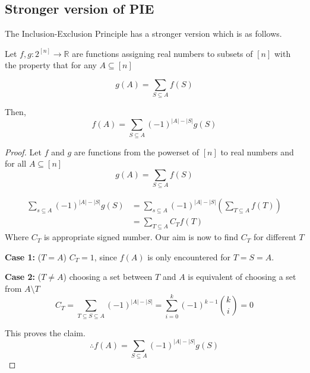 \subsection{Stronger version of PIE}
The Inclusion-Exclusion Principle has a stronger version which is as follows.

\begin{theorem}
  \label{stronger PIE}
  Let $f,g:2^{[n]}\longrightarrow \mathbb{R}$ are functions assigning real numbers to subsets of $[n]$ with the property that for any $A\subseteq [n]$

  \[ g(A)=\sum_{S\subseteq A} f(S)\]

  Then,
  \[ f(A) = \sum_{S \subseteq A} (-1)^{|A|-|S|}g(S)\]

\end{theorem}


\begin{proof}
  Let $f$ and $g$ are functions from the powerset of $[n]$ to real numbers and for all $A \subseteq [n]$
  \[g(A)=\sum_{S\subseteq A}f(S)\]

  \begin{align}
    \sum _{s\subseteq A}( -1)^{|A|-|S|} g( S) & =\sum _{s\subseteq A}( -1)^{|A|-|S|}\left(\sum _{T\subseteq A} f( T)\right) \nonumber \\
                                              & =\sum _{T\subseteq A} C_{T} f( T)
  \end{align}
  Where $C_T$ is appropriate signed number. Our aim is now to find $C_T$ for different $T$

  \begin{description}
    \item{\textbf{Case 1: }($T=A$)} $C_T=1$, since $f(A)$ is only encountered for $T=S=A$.

    \item{\textbf{Case 2: }($T \neq A$)} choosing a set between $T$ and $A$ is equivalent of choosing a set from $A\setminus T$
          \[C_T=\sum _{T \subseteq S\subseteq A}( -1)^{|A|-|S|}=\sum^k_{i=0}(-1)^{k-1} {k \choose i} =0 \]
  \end{description}
  This proves the claim.
  \[\boxed{\therefore f(A) =  \sum_{S \subseteq A} (-1)^{|A|-|S|}g(S)}\]
\end{proof}

